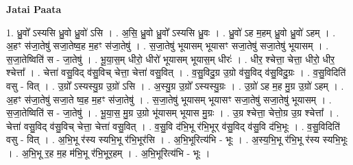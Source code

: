\documentclass[17pt]{extarticle}
\begin{document}
\textbf{Jatai Paata} \newline

1. ध्रु॒वो᳚ ऽस्यसि ध्रु॒वो ध्रु॒वो॑ ऽसि । . अ॒सि॒ ध्रु॒वो ध्रु॒वो᳚ ऽस्यसि ध्रु॒वः । . ध्रु॒वो॑ ऽह म॒हम् ध्रु॒वो ध्रु॒वो॑ ऽहम् । . अ॒हꣳ स॑जा॒तेषु॑ सजा॒तेष्व॒ह म॒हꣳ स॑जा॒तेषु॑ । . स॒जा॒तेषु॑ भूयासम् भूयासꣳ सजा॒तेषु॑ सजा॒तेषु॑ भूयासम् । . स॒जा॒तेष्विति॑ स - जा॒तेषु॑ । . भू॒या॒स॒म् धीरो॒ धीरो॑ भूयासम् भूयास॒म् धीरः॑ । . धीर॒ श्चेत्ता॒ चेत्ता॒ धीरो॒ धीर॒ श्चेत्ता᳚ । . चेत्ता॑ वसु॒विद् व॑सु॒विच् चेत्ता॒ चेत्ता॑ वसु॒वित् । . व॒सु॒विदु॒ग्र उ॒ग्रो व॑सु॒विद् व॑सु॒विदु॒ग्रः । . व॒सु॒विदिति॑ वसु - वित् । . उ॒ग्रो᳚ ऽस्यस्यु॒ग्र उ॒ग्रो॑ ऽसि । . अ॒स्यु॒ग्र उ॒ग्रो᳚ ऽस्यस्यु॒ग्रः । . उ॒ग्रो॑ ऽह म॒ह मु॒ग्र उ॒ग्रो॑ ऽहम् । . अ॒हꣳ स॑जा॒तेषु॑ सजा॒ते ष्व॒ह म॒हꣳ स॑जा॒तेषु॑ । . स॒जा॒तेषु॑ भूयासम् भूयासꣳ सजा॒तेषु॑ सजा॒तेषु॑ भूयासम् । . स॒जा॒तेष्विति॑ स - जा॒तेषु॑ । . भू॒या॒स॒ मु॒ग्र उ॒ग्रो भू॑यासम् भूयास मु॒ग्रः । . उ॒ग्र श्चेत्ता॒ चेत्तो॒ग्र उ॒ग्र श्चेत्ता᳚ । . चेत्ता॑ वसु॒विद् व॑सु॒विच् चेत्ता॒ चेत्ता॑ वसु॒वित् । . व॒सु॒वि द॑भि॒भू र॑भि॒भूर् व॑सु॒विद् व॑सु॒वि द॑भि॒भूः । . व॒सु॒विदिति॑ वसु - वित् । . अ॒भि॒भू र॑स्य स्यभि॒भू र॑भि॒भूर॑सि । . अ॒भि॒भूरित्य॑भि - भूः । . अ॒स्य॒भि॒भू र॑भि॒भू र॑स्य स्यभि॒भूः । . अ॒भि॒भू र॒ह म॒ह म॑भि॒भू र॑भि॒भूर॒हम् । . अ॒भि॒भूरित्य॑भि - भूः । \newline
\end{document}
